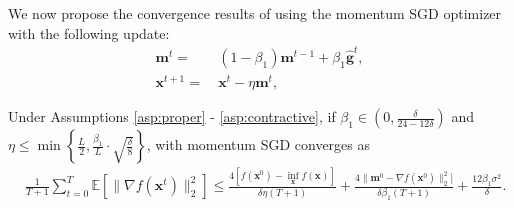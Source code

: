 
We now propose the convergence results of \celora using  the momentum SGD optimizer with the following update:
\begin{align*}
\mathbf{m}^t=&\ (1-\beta_1)\mathbf{m}^{t-1}+\beta_1\hat{\mathbf{g}}^t,\\
\mathbf{x}^{t+1}=&\ \mathbf{x}^t-\eta \mathbf{m}^t,
\end{align*}
\begin{theorem}\label{thm:celora}
    Under Assumptions \ref{asp:proper} - \ref{asp:contractive}, if $\beta_1\in\left(0,\frac{\delta}{24-12\delta}\right)$ and $\eta\le\min\left\{\frac{L}{2}, \frac{\beta_1}{L}\cdot\sqrt{\frac{\delta}{8}}\right\}$, \celora with momentum SGD converges as
    \begin{align*}
        &\frac{1}{T+1}\sum_{t=0}^T\mathbb{E}[\|\nabla f(\mathbf{x}^t)\|_2^2]
        \le\frac{4[f(\mathbf{x}^0)-\inf_{\mathbf{x}}f(\mathbf{x})]}{\delta\eta(T+1)}+\frac{4\|\mathbf{m}^0-\nabla f(\mathbf{x}^0)\|_2^2]}{\delta\beta_1(T+1)}+\frac{12\beta_1\sigma^2}{\delta}. \nonumber
    \end{align*}
\end{theorem}

